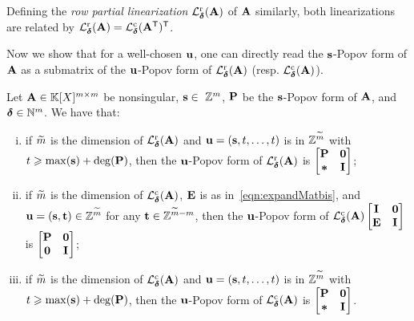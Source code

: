 \documentclass[preprint]{sig-alternate-05-2015}
\begin{document}
\vspace{-0.1cm}
Defining the \emph{row partial linearization} $\rowParLin{\minDegs}{\mat{A}}$
of $\mat{A}$ similarly, both linearizations are related by
$\rowParLin{\minDegs}{\mat{A}} = \trsp{\colParLin{\minDegs}{\trsp{\mat{A}}}}$.

Now we show that for a well-chosen $\shifts[u]$, one can directly read the
$\shifts$-Popov form of $\mat{A}$ as a submatrix of the $\shifts[u]$-Popov form
of $\rowParLin{\minDegs}{\mat{A}}$ (resp. $\colParLin{\minDegs}{\mat{A}}$).

\vspace{-0.1cm}
\begin{lem}
  \label{lem:parlin_reduction}
  Let $\mat{A} \in \polMatSpace[\rdim]$ be nonsingular, $\shifts
  \in~\shiftSpace$, $\popov$ be the $\shifts$-Popov form of $\mat{A}$, and
  $\minDegs \in \NN^\rdim$. We have that:
  \vspace{-0.15cm}
  \begin{enumerate}[(i)]
    \setlength\itemsep{0cm}
    \item if $\expand{\rdim}$ is the dimension of
      $\rowParLin{\minDegs}{\mat{A}}$ and $\shifts[u] = (\shifts,t,\ldots,t)$
      is in $\shiftSpace[\expand{\rdim}]$ with $t \ge
      \max(\shifts)+\deg(\popov)$, then the $\shifts[u]$-Popov form of
      $\rowParLin{\minDegs}{\mat{A}}$ is $\begin{bmatrix} \popov & \mathbf{0}
        \\ \anyMat & \idMat[] \end{bmatrix}$;
    \item if $\expand{\rdim}$ is the dimension of
      $\colParLin{\minDegs}{\mat{A}}$, $\mat{E}$ is as
      in~\eqref{eqn:expandMatbis}, and $\shifts[u] = (\shifts,\shifts[t]) \in
      \shiftSpace[\expand{\rdim}]$ for any $\shifts[t] \in
      \shiftSpace[\expand{\rdim}-\rdim]$, then the $\shifts[u]$-Popov form of
      $\colParLin{\minDegs}{\mat{A}}
        \begin{bmatrix}
          \idMat[] & \mat{0} \\
          \mat{E} & \idMat[]
        \end{bmatrix}$
      is
      $\begin{bmatrix}
        \popov & \mat{0} \\
        \mat{0} & \idMat[]
      \end{bmatrix}$;
    \item if $\expand{\rdim}$ is the dimension of
      $\colParLin{\minDegs}{\mat{A}}$ and $\shifts[u] = (\shifts,t,\ldots,t)$
      is in $\shiftSpace[\expand{\rdim}]$ with $t \ge
      \max(\shifts)+\deg(\popov)$, then the $\shifts[u]$-Popov form of
      $\colParLin{\minDegs}{\mat{A}}$ is $\begin{bmatrix} \popov & \mathbf{0}
        \\ \anyMat & \idMat[] \end{bmatrix}$.
  \end{enumerate}
\end{lem}
\end{document}
